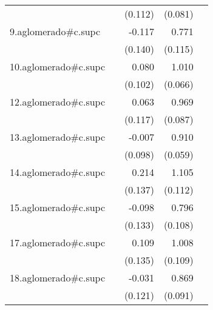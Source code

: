 {\begin{longtable}{l*{4}{D{.}{.}{-1}}}
            &                     &     (0.112)         &     (0.081)         &                     \\
\addlinespace
9.aglomerado#c.supc&                     &      -0.117         &       0.771\sym{***}&                     \\
            &                     &     (0.140)         &     (0.115)         &                     \\
\addlinespace
10.aglomerado#c.supc&                     &       0.080         &       1.010\sym{***}&                     \\
            &                     &     (0.102)         &     (0.066)         &                     \\
\addlinespace
12.aglomerado#c.supc&                     &       0.063         &       0.969\sym{***}&                     \\
            &                     &     (0.117)         &     (0.087)         &                     \\
\addlinespace
13.aglomerado#c.supc&                     &      -0.007         &       0.910\sym{***}&                     \\
            &                     &     (0.098)         &     (0.059)         &                     \\
\addlinespace
14.aglomerado#c.supc&                     &       0.214         &       1.105\sym{***}&                     \\
            &                     &     (0.137)         &     (0.112)         &                     \\
\addlinespace
15.aglomerado#c.supc&                     &      -0.098         &       0.796\sym{***}&                     \\
            &                     &     (0.133)         &     (0.108)         &                     \\
\addlinespace
17.aglomerado#c.supc&                     &       0.109         &       1.008\sym{***}&                     \\
            &                     &     (0.135)         &     (0.109)         &                     \\
\addlinespace
18.aglomerado#c.supc&                     &      -0.031         &       0.869\sym{***}&                     \\
            &                     &     (0.121)         &     (0.091)         &                     \\

\end{longtable}}
